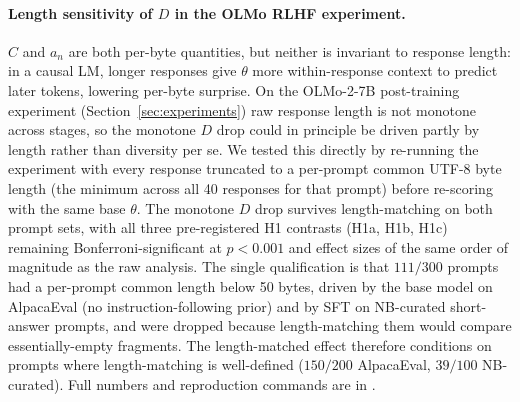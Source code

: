 \paragraph{Length sensitivity of $D$ in the OLMo RLHF experiment.}
$C$ and $a_n$ are both per-byte quantities, but neither is invariant to response length: in a causal LM, longer responses give $\theta$ more within-response context to predict later tokens, lowering per-byte surprise.
On the OLMo-2-7B post-training experiment (Section~\ref{sec:experiments}) raw response length is not monotone across stages, so the monotone $D$ drop could in principle be driven partly by length rather than diversity per se.
We tested this directly by re-running the experiment with every response truncated to a per-prompt common UTF-8 byte length (the minimum across all 40 responses for that prompt) before re-scoring with the same base $\theta$.
The monotone $D$ drop survives length-matching on both prompt sets, with all three pre-registered H1 contrasts (H1a, H1b, H1c) remaining Bonferroni-significant at $p<0.001$ and effect sizes of the same order of magnitude as the raw analysis.
The single qualification is that $111/300$ prompts had a per-prompt common length below 50 bytes, driven by the base model on AlpacaEval (no instruction-following prior) and by SFT on NB-curated short-answer prompts, and were dropped because length-matching them would compare essentially-empty fragments.
The length-matched effect therefore conditions on prompts where length-matching is well-defined ($150/200$ AlpacaEval, $39/100$ NB-curated).
Full numbers and reproduction commands are in .

